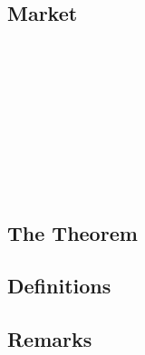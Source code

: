 \documentclass{beamer}
\numberwithin{equation}{section}
\begin{document}
\subsection{Market}

\begin{frame}\frametitle{{\normalsize \secname} \\ {\large \subsecname}}
\end{frame}

\begin{frame}\frametitle{{\normalsize \secname} \\ {\large \subsecname}}
\end{frame}

\begin{frame}\frametitle{{\normalsize \secname} \\ {\large \subsecname}}
\end{frame}

\begin{frame}\frametitle{{\normalsize \secname} \\ {\large \subsecname}}
\end{frame}

\subsection{The Theorem}
\subsection{Definitions}
\subsection{Remarks}
\end{document}
